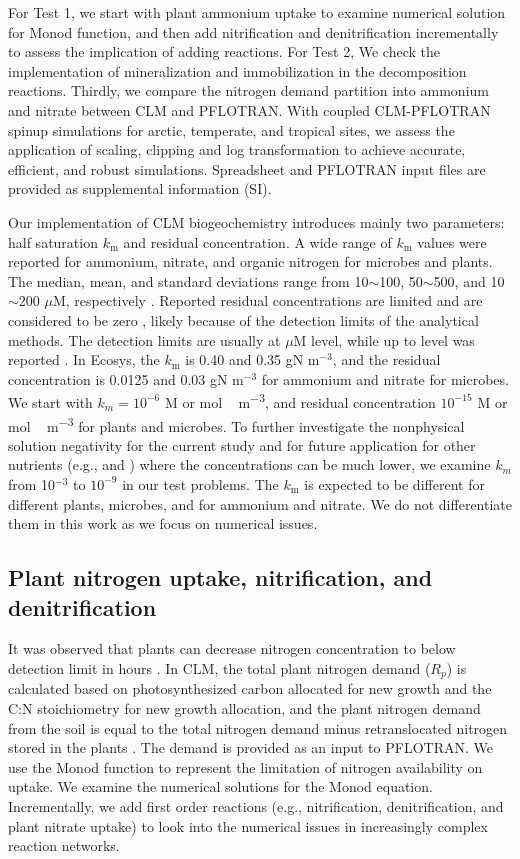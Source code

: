 \documentclass[gmd, manuscript]{copernicus}
\begin{document}
For Test 1, we start with plant ammonium uptake to examine numerical solution for Monod function, and then add nitrification and denitrification incrementally to assess the implication of adding reactions. For Test 2, We check the implementation of mineralization and immobilization in the decomposition reactions. Thirdly, we compare the nitrogen demand partition into ammonium and nitrate between CLM and PFLOTRAN. With coupled CLM-PFLOTRAN spinup simulations for arctic, temperate, and tropical sites, we assess the application of scaling, clipping and log transformation to achieve accurate, efficient, and robust simulations. Spreadsheet and PFLOTRAN input files are provided as supplemental information (SI).

Our implementation of CLM biogeochemistry introduces mainly two parameters: half saturation $k_\text{m}$ and residual concentration. A wide range of $k_\text{m}$ values were reported for ammonium, nitrate, and organic nitrogen for microbes and plants. The median, mean, and standard deviations range from 10$\sim$100, 50$\sim$500, and 10$\sim$200 $\mu$M, respectively
\citep{Kuzyakov2013}. Reported residual concentrations are limited and are considered to be zero \cite[e.g.,][]{Hogh1997}, likely because of the detection limits of the analytical methods. The detection limits are usually at
$\mu$M level, while up to  level was reported \citep{Nollet2013}. In Ecosys,
the $k_\text{m}$ is 0.40 and 0.35 gN m$^{-3}$, and the residual concentration
is 0.0125 and 0.03 gN m$^{-3}$ \citep{Grant2013} for ammonium and
nitrate for microbes.  
We start with $k_m=10^{-6}$ \unit{M} or \unit{mol\,m^{-3}},
and residual concentration $10^{-15}$ \unit{M} or \unit{mol\, m^{-3}} for
plants and microbes. To further investigate the nonphysical solution negativity for the
current study and for future application for other nutrients (e.g., 
and ) where the concentrations can be much lower, we examine $k_m$
from 10$^{-3}$ to $10^{-9}$ in our test problems. The $k_\text{m}$ is expected
to be different for different plants, microbes, and for ammonium and
nitrate. We do not differentiate them in this work as we focus on
numerical issues. 

\subsection{Plant nitrogen uptake, nitrification, and denitrification}
\label{sec:test1}
It was observed that plants can decrease nitrogen concentration to below
detection limit in hours \citep{Kamer2001}. 
In CLM, the total plant nitrogen demand ($R_p$) is
calculated based on photosynthesized carbon allocated for new growth and the
C:N stoichiometry for new growth allocation, and the plant nitrogen demand from
the soil is equal to the total nitrogen demand minus retranslocated nitrogen
stored in the plants  \citep{Oleson2013}. The demand is provided
as an input to PFLOTRAN. We use the
Monod function to represent the limitation of nitrogen availability on uptake.
We examine the numerical solutions for the Monod equation. Incrementally, we
add first order reactions (e.g., nitrification, denitrification, and plant
nitrate uptake) to look into the numerical issues in increasingly complex reaction networks. 
\end{document}
